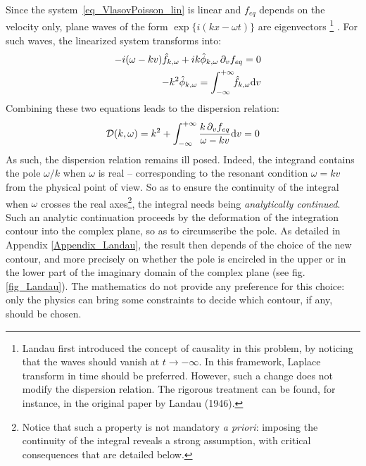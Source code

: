 \documentclass[11pt]{article}
\newcommand{\dd}{\textrm d}
\begin{document}
Since the system~\eqref{eq_VlasovPoisson_lin} is linear and $f_{eq}$
depends on the velocity only, plane waves of the form
$\exp\{i(kx-\omega t)\}$ are eigenvectors 
\footnote{ 
Landau first introduced the concept of causality in this problem, by noticing that the waves should vanish at $t\rightarrow -\infty$. In this framework, Laplace transform in time should be preferred. However, such a change does not modify the dispersion relation. The rigorous treatment can be found, for instance, in the original paper by Landau (1946).}
. For such waves, the linearized system transforms
into:
\begin{eqnarray*}
\label{eq_VlasovPoisson_Fourier}
&& -i(\omega-kv)\hat f_{k,\omega} +
  i k\hat\phi_{k,\omega}\,\partial_v f_{eq} = 0 \\
&& -k^{2} \hat\phi_{k,\omega} =
  \int_{-\infty}^{+\infty}\!\! \hat f_{k,\omega} \dd v
\end{eqnarray*}
Combining these two equations leads to the dispersion relation:
\begin{equation}
 \label{eq_VlasovPoisson_reldisp}
  \mathcal{D} (k,\omega)= k^2 + \int_{-\infty}^{+\infty}
  \frac{k\, \partial_v f_{eq}}{\omega - kv} \dd v = 0
\end{equation}
As such, the dispersion relation remains ill posed. Indeed, the integrand contains the pole $\omega/k$ when $\omega$ is real -- corresponding to the resonant condition $\omega = kv$ from the physical point of view. So as to ensure the continuity of the integral when $\omega$ crosses the real axes\footnote{Notice that such a property is not mandatory \emph{a priori}: imposing the continuity of the integral reveals a strong assumption, with critical consequences that are detailed below.}, the integral needs being \emph{analytically continued}. Such an analytic continuation proceeds by the deformation of the integration contour into the complex plane, so as to circumscribe the pole. As detailed in Appendix \ref{Appendix_Landau}, the result then depends of the choice of the new contour, and more precisely on whether the pole is encircled in the upper or in the lower part of the imaginary domain of the complex plane (see fig.\ref{fig_Landau}). The mathematics do not provide any preference for this choice: only the physics can bring some constraints to decide which contour, if any, should be chosen.\\
\end{document}
